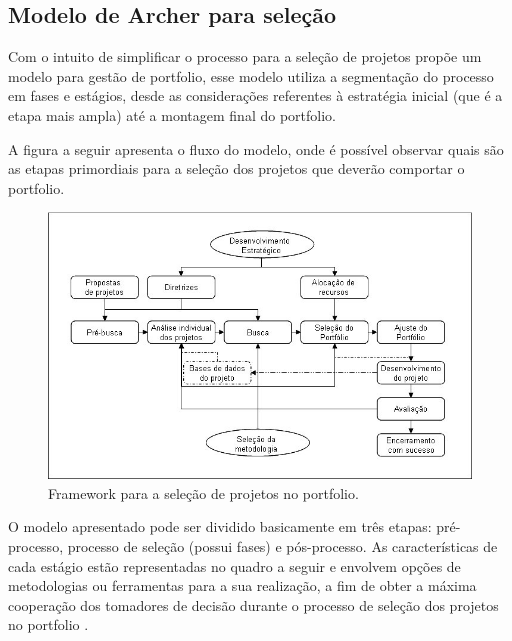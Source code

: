 \documentclass[12pt,a4paper,ruledheader,tocpage=prefix,floatnumber=continuous,pagestart=folhaderosto,font=times]{abnt}
\begin{document}
\subsection{Modelo de Archer para seleção}
Com o intuito de simplificar o processo para a seleção de projetos \cite{archer} propõe um modelo para gestão de portfolio, esse modelo utiliza a 
segmentação do processo em fases e estágios, desde as considerações referentes à estratégia inicial (que é a etapa mais ampla) até a montagem final do 
portfolio.

A figura a seguir apresenta o fluxo do modelo, onde é possível observar quais são as etapas primordiais para a seleção dos projetos que deverão comportar
o portfolio.

\begin{figure}[H]
\centering
\includegraphics[width=.9\textwidth]{archer.jpg}
\caption{Framework para a seleção de projetos no portfolio\cite{archer}.}
\end{figure}

O modelo apresentado pode ser dividido basicamente em três etapas: pré-processo, processo de seleção (possui fases) e pós-processo. As características 
de cada estágio estão representadas no quadro a seguir e envolvem opções de metodologias ou ferramentas para a sua realização, a fim de obter a máxima 
cooperação dos tomadores de decisão durante o processo de seleção dos projetos no portfolio \cite{archer}. 
\end{document}
